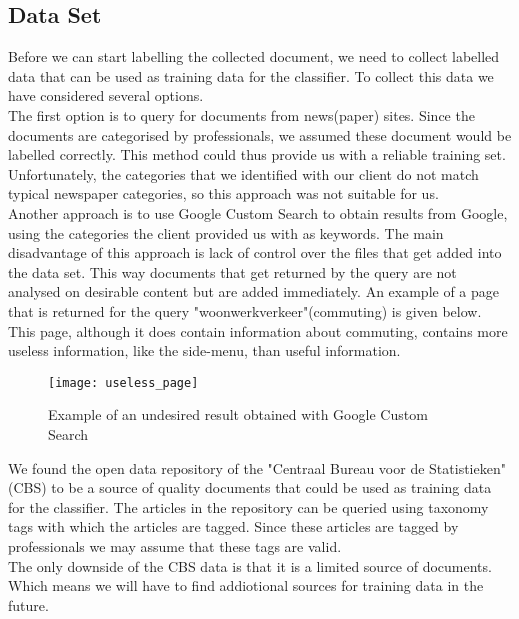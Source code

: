 \subsection{Data Set}\label{sec: data-set-research}
Before we can start labelling the collected document, we need to collect labelled data that can be used as training data for the classifier. To collect this data we have considered several options.\\

The first option is to query for documents from news(paper) sites. Since the documents are categorised by professionals, we assumed these document would be labelled correctly. This method could thus provide us with a reliable training set.
Unfortunately, the categories that we identified with our client do not match typical newspaper categories, so this approach was not suitable for us.\\

Another approach is to use Google Custom Search to obtain results from Google, using the categories the client provided us with as keywords. The main disadvantage of this approach is lack of control over the files that get added into the data set. This way documents that get returned by the query are not analysed on desirable content but are added immediately. An example of a page that is returned for the query "woonwerkverkeer"(commuting) is given below. This page, although it does contain information about commuting, contains more useless information, like the side-menu, than useful information.\\

\begin{figure}[H]
\centering
\texttt{[image: useless\_page]}
\caption{Example of an undesired result obtained with Google Custom Search}
\label{fig:useless_page}
\end{figure}

We found the open data repository of the "Centraal Bureau voor de Statistieken" (CBS) to be a source of quality documents that could be used as training data for the classifier. The articles in the repository can be queried using taxonomy tags with which the articles are tagged. Since these articles are tagged by professionals we may assume that these tags are valid.\\
The only downside of the CBS data is that it is a limited source of documents. Which means we will have to find addiotional sources for training data in the future.


